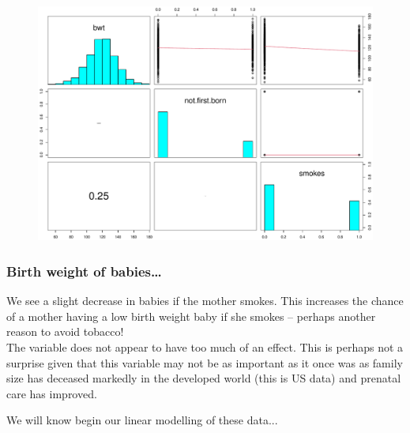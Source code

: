\documentclass{beamer}\usepackage[]{graphicx}\usepackage[]{xcolor}
\makeatletter
\newenvironment{kframe}{%
 \def\at@end@of@kframe{}%
 \ifinner\ifhmode%
  \def\at@end@of@kframe{\end{minipage}}%
  \begin{minipage}{\columnwidth}%
 \fi\fi%
 \def\FrameCommand##1{\hskip\@totalleftmargin \hskip-\fboxsep
 \colorbox{shadecolor}{##1}\hskip-\fboxsep
     \hskip-\linewidth \hskip-\@totalleftmargin \hskip\columnwidth}%
 \MakeFramed {\advance\hsize-\width
   \@totalleftmargin\z@ \linewidth\hsize
   \@setminipage}}%
 {\par\unskip\endMakeFramed%
 \at@end@of@kframe}
\newenvironment{knitrout}{}{} %
\makeatother
\begin{document}
\begin{frame}[fragile]
\begin{knitrout}
\begin{kframe}
{\ttfamily\noindent\color{warningcolor}{Warning in par(usr): argument 1 does not name a graphical parameter}}

{\ttfamily\noindent\color{warningcolor}{Warning in par(usr): argument 1 does not name a graphical parameter}}\end{kframe}
\end{knitrout}

\begin{figure}
  \centering
  \includegraphics[scale = 0.3]{figure/RC-H10-013}
\end{figure}

\end{frame}


\begin{frame}[fragile]
\frametitle{Birth weight of babies\ldots}
We see a slight decrease in babies  if the mother smokes. This increases the chance of a mother having a low birth weight baby if she smokes -- perhaps another reason to avoid tobacco!\\
\bigskip
The variable  does not appear to have too much of an effect. This is perhaps not a surprise given that this variable may not be as important as it once was as family size has deceased markedly in the developed world (this is US data) and prenatal care has improved.\\
\bigskip

We will know begin our linear modelling of these data...
\end{frame}
\end{document}
